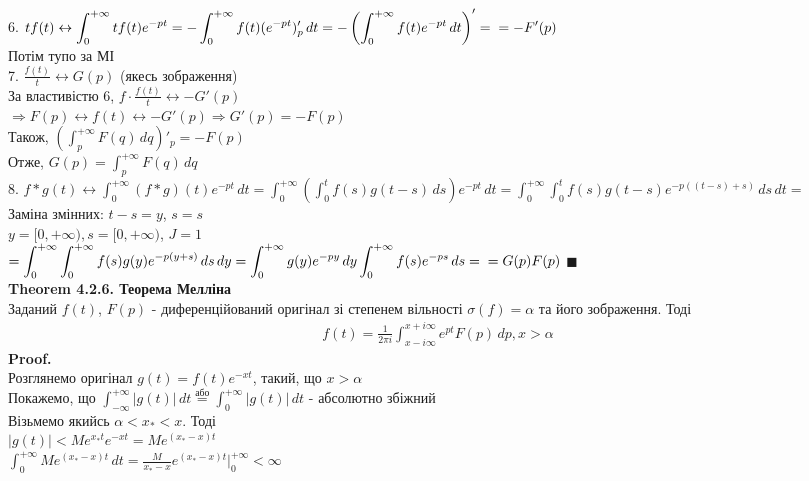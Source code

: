 \documentclass{math_library}
\begin{document}
\bigskip \\
6. $t f(t) \leftrightarrow \displaystyle \int_0^{+\infty} tf(t)e^{-pt} = -\int_0^{+\infty} f(t) (e^{-pt})'_p\,dt = - \left(\int_0^{+\infty} f(t)e^{-pt}\,dt \right)' = \\ = -F'(p)$\\
Потім тупо за МІ
\bigskip \\
7. $\displaystyle \frac{f(t)}{t} \leftrightarrow G(p)$ (якесь зображення)\\
За властивістю 6, $\displaystyle f \cdot \frac{f(t)}{t} \leftrightarrow -G'(p)$\\
$\Rightarrow F(p) \leftrightarrow f(t) \leftrightarrow -G'(p) \Rightarrow G'(p) = -F(p)$\\
Також, $\displaystyle \left(\int_p^{+\infty} F(q)\,dq \right)'_p = -F(p)$\\
Отже, $G(p) = \displaystyle \int_p^{+\infty} F(q)\,dq$
\bigskip \\
8. $f*g(t) \leftrightarrow \displaystyle \int_0^{+\infty} (f*g)(t)e^{-pt}\,dt = \int_0^{+\infty} \left( \int_0^t f(s)g(t-s)\,ds \right)e^{-pt}\,dt = \int_0^{+\infty} \int_0^t f(s)g(t-s)e^{-p((t-s)+s)}\,ds\,dt =$\\
Заміна змінних: $t-s=y$, $s=s$\\
$y = [0,+\infty), s = [0,+\infty)$, $J=1$\\
$\displaystyle = \int_0^{+\infty} \int_0^{+\infty} f(s)g(y)e^{-p(y+s)}\,ds\,dy = \int_0^{+\infty} g(y)e^{-py}\,dy \int_0^{+\infty} f(s)e^{-ps}\,ds = \\ =G(p)F(p)$
$\blacksquare$
\bigskip \\
\textbf{Theorem 4.2.6. Теорема Мелліна}\\
Заданий $f(t)$, $F(p)$ - диференційований оригінал зі степенем вільності $\sigma(f) = \alpha$ та його зображення. Тоді
\begin{align*}
f(t) = \frac{1}{2 \pi i} \int_{x - i\infty}^{x + i\infty} e^{pt}F(p)\,dp, x > \alpha
\end{align*}
\textbf{Proof.}\\
Розглянемо оригінал $g(t) = f(t)e^{-xt}$, такий, що $x>\alpha$\\
Покажемо, що $\displaystyle \int_{-\infty}^{+\infty} |g(t)|\,dt \overset{\textrm{або}}{=} \int_{0}^{+\infty} |g(t)|\,dt$ - абсолютно збіжний\\
Візьмемо якийсь $\alpha<x_*<x$. Тоді\\
$|g(t)| < Me^{x_* t}e^{-xt} = Me^{(x_*-x)t}$\\
$\displaystyle \int_0^{+\infty} M e^{(x_*-x)t}\,dt = \frac{M}{x_*-x}e^{(x_*-x)t}\Big|_0^{+\infty} < \infty$\\
\end{document}
